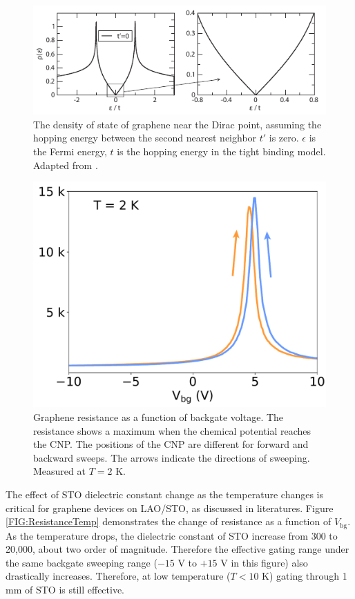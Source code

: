 \documentclass[pdflatex, sectionletters, 12pt]{pittetd}    %
\begin{document}
\begin{figure}[h!]
	\centering
	\includegraphics[width=.9\textwidth]{Drawing/DOS.pdf}
	\caption{The density of state of graphene near the Dirac point, assuming the hopping energy between the second nearest neighbor $t'$ is zero. $\epsilon$ is the Fermi energy, $t$ is the hopping energy in the tight binding model. Adapted from \cite{neto2009electronic}.}
	\label{FIG:DOS}
\end{figure}

\begin{figure}[h!]
	\centering
	\includegraphics[width=.6\textwidth]{Drawing/DiracPeak.pdf}
	\caption{Graphene resistance as a function of backgate voltage. The resistance shows a maximum when the chemical potential reaches the CNP. The positions of the CNP are different for forward and backward sweeps. The arrows indicate the directions of sweeping. Measured at $T = 2$ K.}
	\label{FIG:DiracPeak}
\end{figure}

The effect of STO dielectric constant change as the temperature changes is critical for graphene devices on LAO/STO, as discussed in literatures\cite{couto2011transport}. Figure \ref{FIG:ResistanceTemp} demonstrates the change of resistance as a function of $V_\mathrm{bg}$. As the temperature drops, the dielectric constant of STO increase from 300 to 20,000, about two order of magnitude. Therefore the effective gating range under the same backgate sweeping range ($-15$ V to $+15$ V in this figure) also drastically increases. Therefore, at low temperature ($T < 10$ K) gating through 1 mm of STO is still effective.
\end{document}
